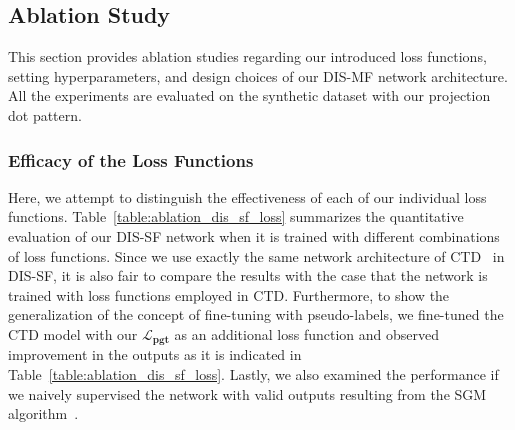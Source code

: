 \subsection{Ablation Study} \label{sec:c2_ablation}
This section provides ablation studies regarding our introduced loss functions, setting hyperparameters, and design choices of our DIS-MF network architecture. All the experiments are evaluated on the synthetic dataset with our projection dot pattern.

\subsubsection{Efficacy of the Loss Functions}
Here, we attempt to distinguish the effectiveness of each of our individual loss functions. Table~\ref{table:ablation_dis_sf_loss} summarizes the quantitative evaluation of our DIS-SF network when it is trained with different combinations of loss functions. Since we use exactly the same network architecture of CTD~\citep{riegler2019connecting} in DIS-SF, it is also fair to compare the results with the case that the network is trained with loss functions employed in CTD. Furthermore, to show the generalization of the concept of fine-tuning with pseudo-labels, we fine-tuned the CTD model with our $\boldsymbol{\mathcal{L}_{pgt}}$ as an additional loss function and observed improvement in the outputs as it is indicated in Table~\ref{table:ablation_dis_sf_loss}. Lastly, we also examined the performance if we naively supervised the network with valid outputs resulting from the SGM algorithm~\citep{hirschmuller2007stereo}.

